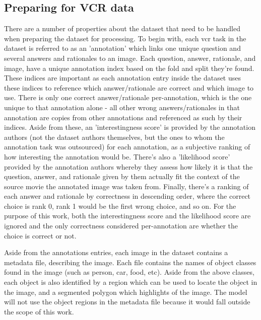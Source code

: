 \subsection{Preparing for VCR data}
\label{subsec:preparing_the_vcr_data}

There are a number of properties about the dataset that need to be handled when preparing the dataset for processing.
To begin with, each \gls{vcr} task in the dataset is referred to as an 'annotation' which links one unique question and several answers and rationales to an image.
Each question, answer, rationale, and image, have a unique annotation index based on the fold and split they're found.
These indices are important as each annotation entry inside the dataset uses these indices to reference which answer/rationale are correct and which image to use.
There is only one correct answer/rationale per-annotation, which is the one unique to that annotation alone - all other wrong answers/rationales in that annotation are copies from other annotations and referenced as such by their indices.
Aside from these, an 'interestingness score' is provided by the annotation authors (not the dataset authors themselves, but the ones to whom the annotation task was outsourced) for each annotation, as a subjective ranking of how interesting the annotation would be.
There's also a 'likelihood score' provided by the annotation authors whereby they assess how likely it is that the question, answer, and rationale given by them actually fit the context of the source movie the annotated image was taken from.
Finally, there's a ranking of each answer and rationale by correctness in descending order, where the correct choice is rank 0, rank 1 would be the first wrong choice, and so on.
For the purpose of this work, both the interestingness score and the likelihood score are ignored and the only correctness considered per-annotation are whether the choice is correct or not.

Aside from the annotations entries, each image in the dataset contains a metadata file, describing the image.
Each file contains the names of object classes found in the image (such as person, car, food, etc).
Aside from the above classes, each object is also identified by a region which can be used to locate the object in the image, and a segmented polygon which highlights of the image.
The model will not use the object regions in the metadata file because it would fall outside the scope of this work.

